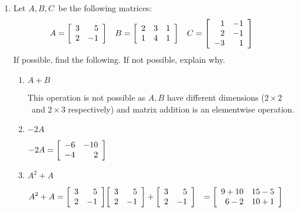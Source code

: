 \documentclass{letter}
\newcommand{\?}{\stackrel{?}{=}}
\newcommand\Que[1]{%
   \leavevmode\noindent
   #1
}
\newcommand\Ans[2][]{%
   \leavevmode\noindent
   {
       \begin{mdframed}[backgroundcolor=blue!10]
       #2
       \end{mdframed}
   }
}
\newenvironment{salign}
 {\par$\!\aligned}
 {\endaligned$\par}
\newenvironment{Mat}[1]{%
  \left[\begin{array}{*{#1}{r}}
}{%
  \end{array}\right]
}
\begin{document}
\begin{enumerate}
    \item Let $A, B, C$\ be the following matrices:
    \begin{align*}
    &A= \begin{Mat}{2}
            3 & 5 \\ 2 & -1
        \end{Mat}
    &&B= \begin{Mat}{3}
            2 & 3 & 1 \\ 1 & 4 & 1
         \end{Mat}
    &&C= \begin{Mat}{2}
            1 & -1 \\ 2 & -1 \\ -3 & 1
          \end{Mat}     
    \end{align*}     
    If possible, find the following.  If not possible, explain why.
    \begin{enumerate}[label=(\alph*)]
        \item\Que{
         $A+B$
        }
        \Ans{
          This operation is not possible as $A, B$ have different dimensions ($2\times 2$\ and $2\times 3$ respectively) and matrix addition is an elementwise operation.
        }    
        \item \Que{
         $-2A$
        }
        \Ans{
            \begin{salign}
            -2A = 
              \begin{Mat}{2}
                -6 & -10 \\ -4 & 2
              \end{Mat}
            \end{salign}
        }
        \item \Que{
          $A^2 + A$
        }
        \Ans{
         \begin{salign}
            A^2+A &=
            \begin{Mat}{2} 3 & 5 \\ 2 & -1 \end{Mat}
            \begin{Mat}{2} 3 & 5 \\ 2 & -1 \end{Mat}
            +
            \begin{Mat}{2} 3 & 5 \\ 2 & -1 \end{Mat}
            &=
            \begin{Mat}{2} 9+10 & 15-5 \\ 6-2 & 10+1 \end{Mat}

\end{salign}}
\end{enumerate}
\end{enumerate}
\end{document}
